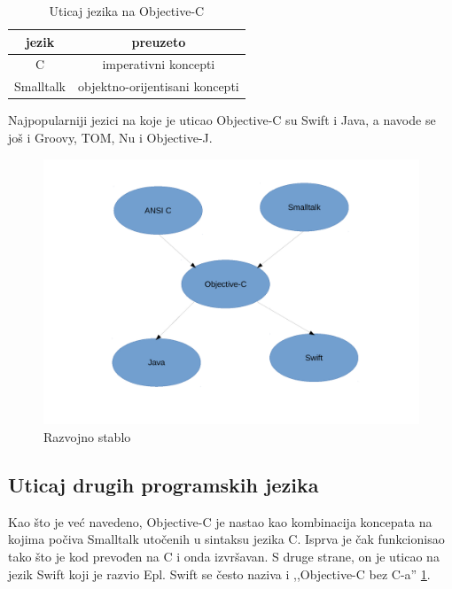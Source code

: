 \documentclass[a4paper]{article}
\begin{document}
{\begin{table}[h!]
\caption{Uticaj jezika na Objective-C}
\begin{center}
\begin{tabular}{|c|c|} \hline
jezik &preuzeto \\ \hline
C &imperativni koncepti \\ \hline
Smalltalk &objektno-orijentisani koncepti \\ \hline
\end{tabular}
\label{tab:tabela1}
\end{center}
\end{table}

Najpopularniji jezici na koje je uticao Objective-C su Swift i Java, a navode se još i Groovy, TOM, Nu i Objective-J.

\begin{figure}[h!]
	\begin{center}
	\includegraphics[scale=0.4]{razvojno_stablo.pdf}
	\caption{Razvojno stablo}	
	\label{fig:Razvojno_stablo}
	\end{center}
\end{figure}

\subsection{Uticaj drugih programskih jezika}
\label{subsec:uticaj}
Kao što je već navedeno, Objective-C je nastao kao kombinacija koncepata na kojima počiva Smalltalk utočenih u sintaksu jezika C. Isprva je čak funkcionisao tako što je kod prevođen na C i onda izvršavan. S druge strane, on je uticao na jezik Swift koji je razvio Epl. Swift \cite{swift} se često naziva i ,,Objective-C bez C-a'' \ref{fig:Razvojno_stablo}. 

}
\end{document}
